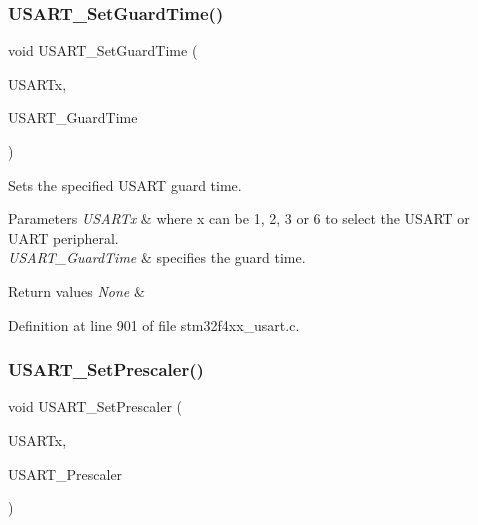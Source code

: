 \subsubsection{\texorpdfstring{U\+S\+A\+R\+T\+\_\+\+Set\+Guard\+Time()}{USART\_SetGuardTime()}}
{\footnotesize\ttfamily void U\+S\+A\+R\+T\+\_\+\+Set\+Guard\+Time (\begin{DoxyParamCaption}\item[{\hyperlink{struct_u_s_a_r_t___type_def}{U\+S\+A\+R\+T\+\_\+\+Type\+Def} $\ast$}]{U\+S\+A\+R\+Tx,  }\item[{uint8\+\_\+t}]{U\+S\+A\+R\+T\+\_\+\+Guard\+Time }\end{DoxyParamCaption})}



Sets the specified U\+S\+A\+RT guard time. 


\begin{DoxyParams}{Parameters}
{\em U\+S\+A\+R\+Tx} & where x can be 1, 2, 3 or 6 to select the U\+S\+A\+RT or U\+A\+RT peripheral. \\
\hline
{\em U\+S\+A\+R\+T\+\_\+\+Guard\+Time} & specifies the guard time. \\
\hline
\end{DoxyParams}

\begin{DoxyRetVals}{Return values}
{\em None} & \\
\hline
\end{DoxyRetVals}


Definition at line 901 of file stm32f4xx\+\_\+usart.\+c.

\mbox{\label{group___u_s_a_r_t_gaf5da8f2eee8245425584d85d4f62cc33}} 
\subsubsection{\texorpdfstring{U\+S\+A\+R\+T\+\_\+\+Set\+Prescaler()}{USART\_SetPrescaler()}}
{\footnotesize\ttfamily void U\+S\+A\+R\+T\+\_\+\+Set\+Prescaler (\begin{DoxyParamCaption}\item[{\hyperlink{struct_u_s_a_r_t___type_def}{U\+S\+A\+R\+T\+\_\+\+Type\+Def} $\ast$}]{U\+S\+A\+R\+Tx,  }\item[{uint8\+\_\+t}]{U\+S\+A\+R\+T\+\_\+\+Prescaler }\end{DoxyParamCaption})}



